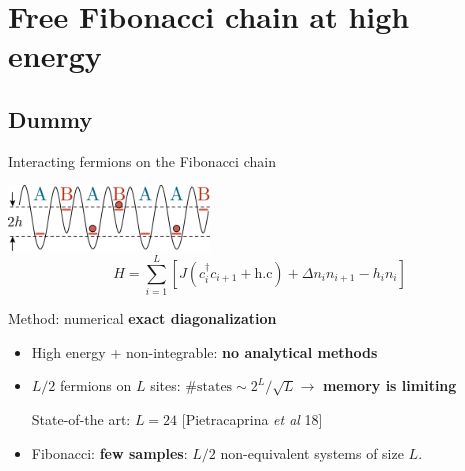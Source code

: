 \section{Free Fibonacci chain at high energy}
\subsection{Dummy}
\begin{frame}{Interacting fermions on the Fibonacci chain}
{

\centering
\includegraphics[width=0.4\textwidth]{img/3_Fibonacci/XXZ_QP_cold_atoms}
\[
	H = \sum_{i=1}^L \left[ J (c_i^\dagger c_{i+1} + \text{h.c}) + \Delta n_i n_{i+1} - h_i n_i \right]
\]
}

\begin{block}{Method: numerical \textbf{exact diagonalization}}
\begin{itemize}
	\item High energy + non-integrable: \textbf{no analytical methods}
	\item $L/2$ fermions on $L$ sites: $\# \text{states} \sim 2^L/\sqrt{L} \to$ \textbf{memory is limiting}

State-of-the art: $L=24$ {\footnotesize[Pietracaprina \emph{et al} 18]}

	\item Fibonacci: \textbf{few samples}: $L/2$ non-equivalent systems of size $L$.
\end{itemize}
\end{block}
\end{frame}

